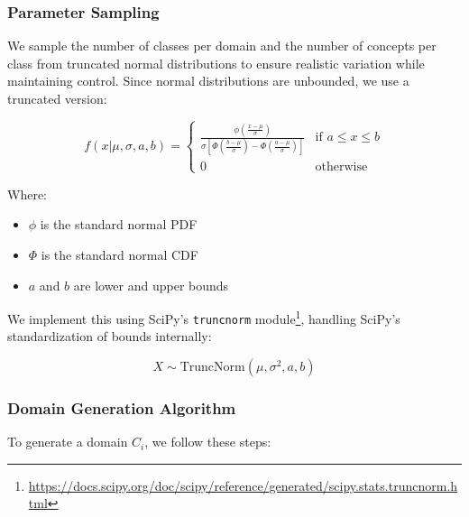 \subsubsection{Parameter Sampling}

We sample the number of classes per domain and the number of concepts per class from truncated normal distributions to ensure realistic variation while maintaining control. Since normal distributions are unbounded, we use a truncated version:

\begin{equation*}
    f(x|\mu, \sigma, a, b) =
    \begin{cases}
        \frac{\phi\left(\frac{x-\mu}{\sigma}\right)}{\sigma\left[\Phi\left(\frac{b-\mu}{\sigma}\right) - \Phi\left(\frac{a-\mu}{\sigma}\right)\right]} & \text{if } a \leq x \leq b \\
        0                                                                                                                                              & \text{otherwise}
    \end{cases}
\end{equation*}

Where:
\begin{itemize}
    \item $\phi$ is the standard normal PDF
    \item $\Phi$ is the standard normal CDF
    \item $a$ and $b$ are lower and upper bounds
\end{itemize}

We implement this using SciPy's \texttt{truncnorm} module\footnote{\url{https://docs.scipy.org/doc/scipy/reference/generated/scipy.stats.truncnorm.html}},
handling SciPy's standardization of bounds internally:

\begin{equation*}
    X \sim \text{TruncNorm}(\mu, \sigma^2, a, b)
\end{equation*}

\subsubsection{Domain Generation Algorithm}

To generate a domain $C_i$, we follow these steps:

